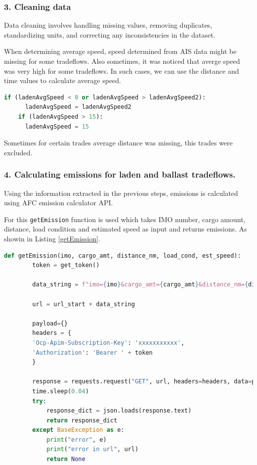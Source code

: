 \subsubsection{3. Cleaning data}

Data cleaning involves handling missing values, removing duplicates, standardizing units, and correcting any inconsistencies in the dataset.

When determining average speed, speed determined from AIS data might be missing for some tradeflows.
Also sometimes, it was noticed that averge speed was very high for some tradeflows.
In such cases, we can use the distance and time values to calculate average speed.


\begin{lstlisting}[language=python, caption=Handling missing speed]
    if (ladenAvgSpeed < 0 or ladenAvgSpeed > ladenAvgSpeed2):
      ladenAvgSpeed = ladenAvgSpeed2
    if (ladenAvgSpeed > 15):
      ladenAvgSpeed = 15
\end{lstlisting}

Sometimes for certain trades average distance was missing, this trades were excluded.

\subsubsection{4. Calculating emissions for laden and ballast tradeflows.}

Using the information extracted in the previous steps, emissions is calculated using AFC emission calculator API.

For this \texttt{getEmission} function is used which takes IMO number, cargo amount, distance, load condition and estimated speed as input and returns emissions.
As showin in Listing \ref{getEmission}.

\begin{lstlisting}[language=python, caption=Handling missing speed, label=getEmission]
    def getEmission(imo, cargo_amt, distance_nm, load_cond, est_speed):
        token = get_token()
        
        data_string = f"imo={imo}&cargo_amt={cargo_amt}&distance_nm={distance_nm}&duration_h={duration_h}&load_cond={load_cond}"
        
        url = url_start + data_string

        payload={}
        headers = {
        'Ocp-Apim-Subscription-Key': 'xxxxxxxxxxx',
        'Authorization': 'Bearer ' + token
        }

        response = requests.request("GET", url, headers=headers, data=payload)
        time.sleep(0.04)
        try:
            response_dict = json.loads(response.text)
            return response_dict
        except BaseException as e:
            print("error", e)
            print("error in url", url)
            return None
\end{lstlisting}


